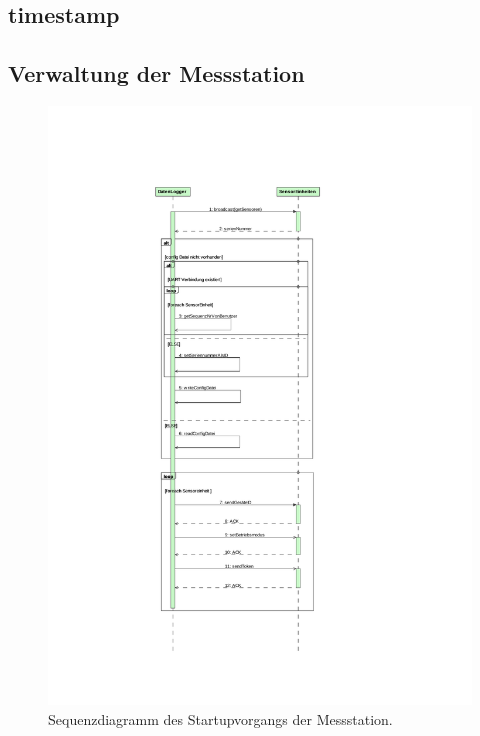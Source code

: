 \subsection{\gls{timestamp}}\label{subsec.sw_timestamp}

\subsection{Verwaltung der Messstation}\label{subsec.sw_busverwaltung}

\begin{figure}[H]
	\centering
		\includegraphics[height=0.9\textheight]{images/magicdraw/StartUpSequenz.pdf}
	\caption{Sequenzdiagramm des Startupvorgangs der Messstation.}
	\label{fig.seq_startup}
\end{figure}

